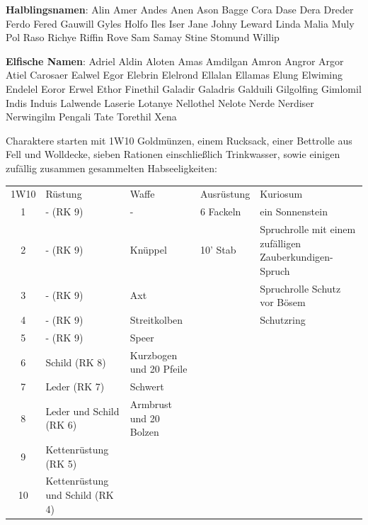 \documentclass[11pt]{wbzine}
\begin{document}
\begin{multicols}{2}
\textbf{Halblingsnamen}:
Alin
Amer
Andes
Anen
Ason
Bagge
Cora
Dase
Dera
Dreder
Ferdo
Fered
Gauwill
Gyles
Holfo
Iles
Iser
Jane
Johny
Leward
Linda
Malia
Muly
Pol
Raso
Richye
Riffin
Rove
Sam
Samay
Stine
Stomund
Willip

\textbf{Elfische Namen}:
Adriel
Aldin
Aloten
Amas
Amdilgan
Amron
Angror
Argor
Atiel
Carosaer
Ealwel
Egor
Elebrin
Elelrond
Ellalan
Ellamas
Elung
Elwiming
Endelel
Eoror
Erwel
Ethor
Finethil
Galadir
Galadris
Galduili
Gilgolfing
Gimlomil
Indis
Induis
Lalwende
Laserie
Lotanye
Nellothel
Nelote
Nerde
Nerdiser
Nerwingilm
Pengali
Tate
Torethil
Xena

Charaktere starten mit 1W10 Goldmünzen, einem Rucksack, einer
Bettrolle aus Fell und Wolldecke, sieben Rationen einschließlich
Trinkwasser, sowie einigen zufällig zusammen gesammelten
Habseeligkeiten:

\end{multicols}
\begin{tabularx}{\textwidth}{cZZZZ}
    1W10 & Rüstung & Waffe & Ausrüstung & Kuriosum \\
1 &
    - (RK 9) &
    - &
    6 Fackeln &
    ein Sonnenstein \\

2 &
 - (RK 9) &
    Knüppel &
    10' Stab &
    Spruchrolle mit einem 
    zufälligen Zauberkundigen-Spruch\\

3 &
 - (RK 9) &
   Axt &
 &
  Spruchrolle Schutz vor Bösem \\

4 &
 - (RK 9) &
 Streitkolben &
 &
 Schutzring \\

5 &
 - (RK 9) &
 Speer &
 &
\\

6 &
 Schild (RK 8) &
 Kurzbogen und 20 Pfeile & 
&
\\

7 &
 Leder (RK 7) &
 Schwert &
&
\\

8 &
 Leder und Schild (RK 6) &
 Armbrust und 20 Bolzen &
 &
\\

9 &
 Kettenrüstung (RK 5) &
 &
 &
\\

10 &
 Kettenrüstung und Schild (RK 4) &
 &
 &
\\

\end{tabularx}
\end{document}

